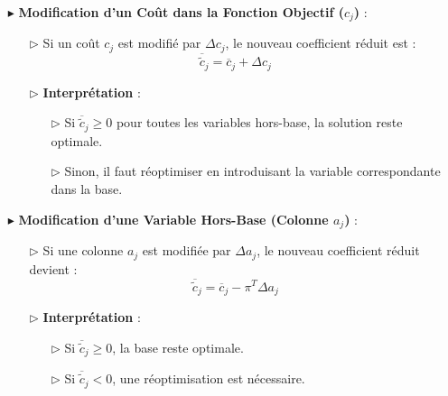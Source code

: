 \documentclass{report}
\begin{document}
\begin{multicols*}{2}
\begin{itemize}
    \item[$\blacktriangleright$] \textbf{Modification d'un Coût dans la Fonction Objectif (\( c_j \))} :
    \begin{itemize}
        \item[$\rhd$] Si un coût \( c_j \) est modifié par \( \Delta c_j \), le nouveau coefficient réduit est :
        \[
        \boxed{\overline{\tilde{c}}_j = \overline{c}_j + \Delta c_j}
        \]
        \item[$\rhd$] \textbf{Interprétation} :
        \begin{itemize}
            \item[$\rhd$] Si \( \overline{\tilde{c}}_j \geq 0 \) pour toutes les variables hors-base, la solution reste optimale.
            \item[$\rhd$] Sinon, il faut réoptimiser en introduisant la variable correspondante dans la base.
        \end{itemize}
    \end{itemize}

    \item[$\blacktriangleright$] \textbf{Modification d'une Variable Hors-Base (Colonne \( a_j \))} :
    \begin{itemize}
        \item[$\rhd$] Si une colonne \( a_j \) est modifiée par \( \Delta a_j \), le nouveau coefficient réduit devient :
        \[
        \boxed{\overline{\tilde{c}}_j = \overline{c}_j - \pi^T \Delta a_j}
        \]
        \item[$\rhd$] \textbf{Interprétation} :
        \begin{itemize}
            \item[$\rhd$] Si \( \overline{\tilde{c}}_j \geq 0 \), la base reste optimale.
            \item[$\rhd$] Si \( \overline{\tilde{c}}_j < 0 \), une réoptimisation est nécessaire.
        \end{itemize}
    \end{itemize}


\end{itemize}
\end{multicols*}
\end{document}
